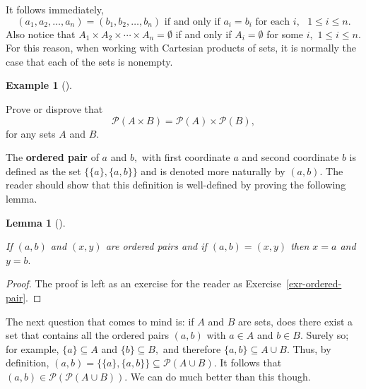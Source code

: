 \documentclass[
  letterpaper,
  10pt,
  reqno,
  twopage,
  openany]{book}
\theoremstyle{plain}
\newtheorem{lemma}{Lemma}[chapter]
\theoremstyle{definition}
\theoremstyle{definition}
\theoremstyle{definition}
\newtheorem{example}{Example}[chapter]
\theoremstyle{plain}
\theoremstyle{plain}
\theoremstyle{remark}
\begin{document}
It follows immediately, \[
(a_1, a_2, \ldots, a_n)=(b_1, b_2, \ldots, b_n)
\text{ if and only if $a_i=b_i$ for each $i,$ $1\leq i \leq n.$}
\] Also notice that \(A_1\times A_2 \times \cdots \times A_n=\emptyset\)
if and only if \(A_i=\emptyset\) for some \(i,\) \(1\leq i \leq n.\) For
this reason, when working with Cartesian products of sets, it is
normally the case that each of the sets is nonempty.

\leavevmode{}%
\begin{example}[]\label{exm-cartesian-product}

Prove or disprove that \[
\mathcal{P}(A\times B)=\mathcal{P}(A)\times \mathcal{P}(B),
\] for any sets \(A\) and \(B.\)

\end{example}

The  \textbf{ordered pair} of \(a\) and \(b,\) with
first coordinate \(a\) and second coordinate \(b\) is defined as the set
\(\{\{a\},\{a,b\}\}\) and is denoted more naturally by \((a,b).\) The
reader should show that this definition is well-defined by proving the
following lemma.

\leavevmode{}%
\begin{lemma}[]\label{lem-ordered-pair}

If \((a,b)\) and \((x,y)\) are ordered pairs and if \((a,b)=(x,y)\) then
\(x=a\) and \(y=b.\)

\end{lemma}

\begin{proof}

The proof is left as an exercise for the reader as
Exercise~\ref{exr-ordered-pair}.

\end{proof}

The next question that comes to mind is: if \(A\) and \(B\) are sets,
does there exist a set that contains all the ordered pairs \((a,b)\)
with \(a\in A\) and \(b\in B.\) Surely so; for example,
\(\{a\}\subseteq A\) and \(\{b\}\subseteq B,\) and therefore
\(\{a,b\}\subseteq A\cup B.\) Thus, by definition,
\((a,b)=\{\{a\},\{a,b\}\}\subseteq \mathcal{P}(A\cup B).\) It follows
that \({(a,b)\in \mathcal{P}(\mathcal{P}(A\cup B)).}\) We can do much
better than this though.
\end{document}

